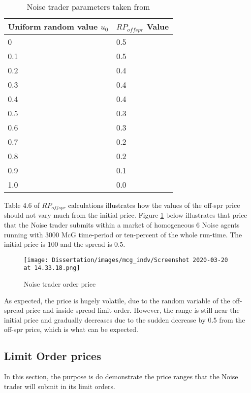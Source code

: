 \begin{table}[h]
\centering
\begin{tabular}{ |m||p{4cm}|} 
\hline
\textbf{Uniform random value $u_0$}& \textbf{$RP_{offspr}$ Value} \\
\hline
\hline
0 & 0.5\\
\hline 
0.1 & 0.5\\
\hline 
0.2 & 0.4\\
\hline 
0.3 & 0.4\\
\hline 
0.4 & 0.4\\
\hline 
0.5 & 0.3\\
\hline 
0.6 & 0.3\\
\hline 
0.7 & 0.2\\
\hline 
0.8 & 0.2\\
\hline 
0.9 & 0.1\\
\hline 
1.0 & 0.0\\
\hline
\end{tabular}
\caption{Noise trader parameters taken from \cite{McGroarty}}
\end{table}
\FloatBarrier 

Table 4.6 of $RP_{offspr}$ calculations illustrates how the values of the off-spr price should not vary much from the initial price. Figure \ref{fig:Noise_test_mp} below illustrates that price that the Noise trader submits within a market of homogeneous 6 Noise agents running with 3000 McG time-period or ten-percent of the whole run-time. The initial price is 100 and the spread is 0.5. 

\begin{figure}[!htbp]
\texttt{[image: Dissertation/images/mcg\_indv/Screenshot 2020-03-20 at 14.33.18.png]}
\caption{Noise trader order price} 
\label{fig:Noise_test_mp}
\end{figure} 
\FloatBarrier

 
As expected, the price is hugely volatile, due to the random variable of the off-spread price and inside spread limit order. However, the range is still near the initial price and gradually decreases due to the sudden decrease by 0.5 from the off-spr price, which is what can be expected. 

\subsection{Limit Order prices}
In this section, the purpose is do demonstrate the price ranges that the Noise trader will submit in its limit orders.

